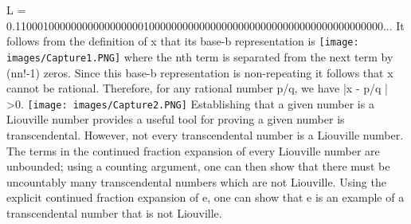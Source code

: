 \documentclass[12pt]{article}
\begin{document}
\newline
L = 0.110001000000000000000001000000000000000000000000000000000000000000...\newline
It follows from the definition of x that its base-b representation is\newline
\texttt{[image: images/Capture1.PNG]}\newline
where the nth term is separated from the next term by (nn!{-1}) zeros.\newline
\newline
Since this base-b representation is non-repeating it follows that x cannot be rational. Therefore, for any rational number p/q, we have |x {-} p/q | >0.\newline
\newline
\texttt{[image: images/Capture2.PNG]}\newline
\newline
\newline
Establishing that a given number is a Liouville number provides a useful tool for proving a given number is transcendental. However, not every transcendental number is a Liouville number. The terms in the continued fraction expansion of every Liouville number are unbounded; using a counting argument, one can then show that there must be uncountably many transcendental numbers which are not Liouville. Using the explicit continued fraction expansion of e, one can show that e is an example of a transcendental number that is not Liouville.
\end{document}
